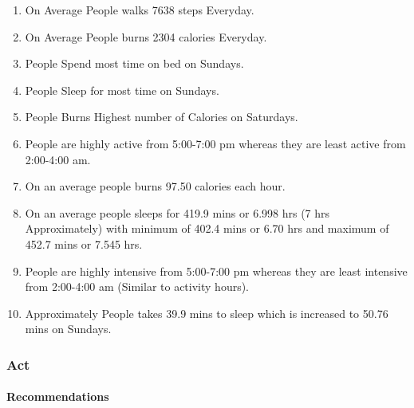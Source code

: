 \documentclass[
]{article}
\providecommand{\tightlist}{%
  \setlength{\itemsep}{0pt}\setlength{\parskip}{0pt}}
\begin{document}
\begin{enumerate}
\def\labelenumi{\arabic{enumi})}
\tightlist
\item
  On Average People walks 7638 steps Everyday.\\
\item
  On Average People burns 2304 calories Everyday.\\
\item
  People Spend most time on bed on Sundays.\\
\item
  People Sleep for most time on Sundays.\\
\item
  People Burns Highest number of Calories on Saturdays.\\
\item
  People are highly active from 5:00-7:00 pm whereas they are least
  active from 2:00-4:00 am.\\
\item
  On an average people burns 97.50 calories each hour.\\
\item
  On an average people sleeps for 419.9 mins or 6.998 hrs (7 hrs
  Approximately) with minimum of 402.4 mins or 6.70 hrs and maximum of
  452.7 mins or 7.545 hrs.\\
\item
  People are highly intensive from 5:00-7:00 pm whereas they are least
  intensive from 2:00-4:00 am (Similar to activity hours).\\
\item
  Approximately People takes 39.9 mins to sleep which is increased to
  50.76 mins on Sundays.
\end{enumerate}

\hypertarget{act}{%
\subsubsection{Act}\label{act}}

\hypertarget{recommendations}{%
\paragraph{Recommendations}\label{recommendations}}
\end{document}
